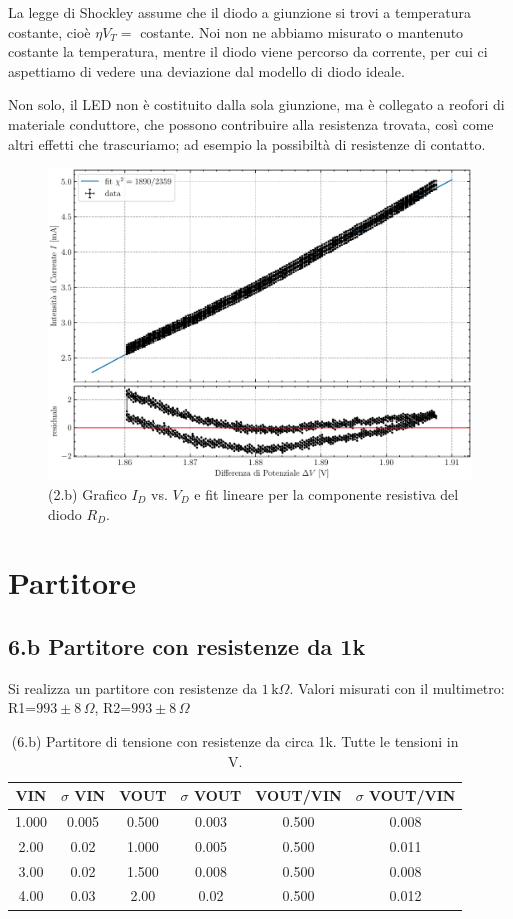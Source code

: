 \documentclass[10pt,a4paper]{article}
\begin{document}
La legge di Shockley assume che il diodo a giunzione si trovi a temperatura
costante, cioè $\eta V_T =$ costante. Noi non ne abbiamo misurato o
mantenuto costante la temperatura, mentre il diodo viene percorso da corrente,
per cui ci aspettiamo di vedere una deviazione dal modello di diodo ideale.

Non solo, il LED non è costituito dalla sola giunzione, ma è collegato a
reofori di materiale conduttore, che possono contribuire alla resistenza
trovata, così come altri effetti che trascuriamo; ad esempio la possibiltà di resistenze di contatto.

\begin{figure}[htb]
\centering
\includegraphics[scale=0.7]{ivlinfit}
\caption{(2.b) Grafico $I_{D}$ vs. $V_{D}$ e fit lineare per la componente
resistiva del diodo $R_D$.}
\end{figure}

\section{Partitore}

\subsection*{6.b Partitore con resistenze da 1k}

Si realizza un partitore con resistenze da $1 \,\mathrm{k}\Omega$.
Valori misurati con il multimetro: R1=$993 \pm 8 \,\Omega$,
R2=$993 \pm 8 \,\Omega$


\begin{table}[h]
\centering
\begin{tabular}{|c|c|c|c|c|c|}
\hline 
VIN& $\sigma$ VIN  & VOUT	 & $\sigma$ VOUT & VOUT/VIN & $\sigma$ VOUT/VIN \\
\hline 
1.000 & 0.005 & 0.500 & 0.003 & 0.500 & 0.008 \\
2.00 & 0.02 & 1.000 & 0.005 & 0.500 & 0.011 \\
3.00 & 0.02 & 1.500 & 0.008 & 0.500 &0.008 \\
4.00 & 0.03 & 2.00 & 0.02 & 0.500 & 0.012 \\
\hline 
\end{tabular} 
\caption{(6.b) Partitore di tensione con resistenze da circa 1k. Tutte le
tensioni in V.\label{tab:div1k}}
\end{table}
\end{document}
